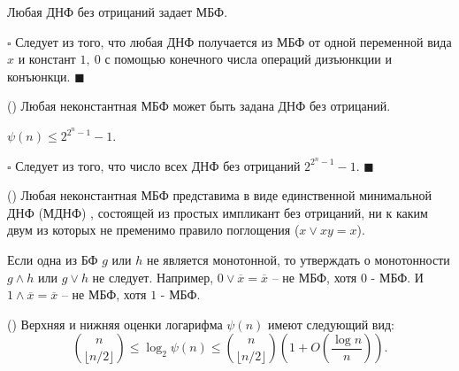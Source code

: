   \begin{Corollary}
    Любая ДНФ без отрицаний задает МБФ.
  \end{Corollary}
    $\square$
    Следует из того, что любая ДНФ получается из МБФ от одной переменной вида $x$ и констант $1,\ 0$
    с помощью конечного числа операций дизъюнкции и конъюнкци.
    $\blacksquare$
  \begin{Corollary}
    (\cite{Moschenski-2001}) Любая неконстантная МБФ может быть задана ДНФ без отрицаний.
  \end{Corollary}
   \begin{Corollary}
    $\psi(n) \leq 2^{2^n-1}-1$.
  \end{Corollary}
   $\square$
    Следует из того, что число всех ДНФ без отрицаний $2^{2^n-1}-1$.
    $\blacksquare$
  \begin{Corollary}
    (\cite{MDNF})
    Любая неконстантная МБФ представима в виде единственной
    минимальной ДНФ (МДНФ) , состоящей из простых импликант без отрицаний, 
    ни к каким двум из которых не пременимо правило поглощения 
    ($x \vee xy = x$).
  \end{Corollary}
  \begin{Remark}
    Если одна из БФ $g$ или $h$ не является монотонной, то утверждать о монотонности 
    $g \wedge h$ или $g \vee h$ не следует.
    Например, $0 \vee \overline{x} = \overline{x}$ -- не МБФ, хотя $0$ - МБФ.
    И $1 \wedge \overline{x} = \overline{x}$ -- не МБФ, хотя $1$ - МБФ.
   \end{Remark}
   \begin{Theorem}(\cite{Dedekind_Number_Asymptotics, Kleitman_Markowsky})
    Верхняя и нижняя оценки логарифма $\psi(n)$ имеют следующий вид:
    $${n\choose \lfloor n/2\rfloor}\le \log_2 \psi(n)\le {n\choose \lfloor n/2\rfloor}\left(1+O\left(\frac{\log n}{n}\right)\right).$$
   \end{Theorem}

